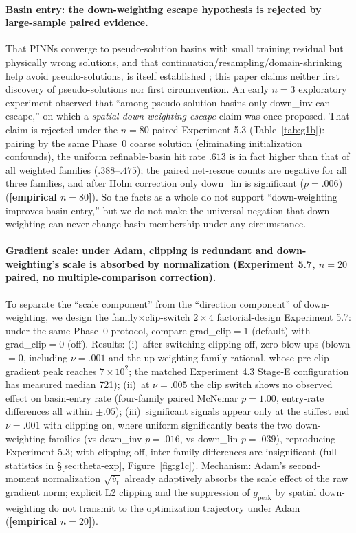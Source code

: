 \documentclass[11pt]{article}
\numberwithin{equation}{section}
\begin{document}
\paragraph{Basin entry: the down-weighting escape hypothesis is rejected by large-sample paired evidence.}
That PINNs converge to pseudo-solution basins with small training residual but physically wrong solutions, and that continuation/resampling/domain-shrinking help avoid pseudo-solutions, is itself established \cite{Rohrhofer2022,WangPseudo2026}; this paper claims neither first discovery of pseudo-solutions nor first circumvention. An early $n=3$ exploratory experiment observed that ``among pseudo-solution basins only down\_inv can escape,'' on which a \emph{spatial down-weighting escape} claim was once proposed. That claim is rejected under the $n=80$ paired Experiment 5.3 (Table~\ref{tab:g1b}): pairing by the same Phase~0 coarse solution (eliminating initialization confounds), the uniform refinable-basin hit rate $.613$ is in fact higher than that of all weighted families ($.388$--$.475$); the paired net-rescue counts are negative for all three families, and after Holm correction only down\_lin is significant ($p=.006$) (\textbf{[empirical $n=80$]}). So the facts as a whole do not support ``down-weighting improves basin entry,'' but we do not make the universal negation that down-weighting can never change basin membership under any circumstance.

\paragraph{Gradient scale: under Adam, clipping is redundant and down-weighting's scale is absorbed by normalization (Experiment 5.7, $n=20$ paired, no multiple-comparison correction).}
To separate the ``scale component'' from the ``direction component'' of down-weighting, we design the family$\times$clip-switch $2\times4$ factorial-design Experiment 5.7: under the same Phase~0 protocol, compare grad\_clip$=1$ (default) with grad\_clip$=0$ (off). Results: (i)~after switching clipping off, zero blow-ups (blown$=0$, including $\nu=.001$ and the up-weighting family rational, whose pre-clip gradient peak reaches $7\times10^2$; the matched Experiment 4.3 Stage-E configuration has measured median 721); (ii)~at $\nu=.005$ the clip switch shows no observed effect on basin-entry rate (four-family paired McNemar $p=1.00$, entry-rate differences all within $\pm.05$); (iii)~significant signals appear only at the stiffest end $\nu=.001$ with clipping on, where uniform significantly beats the two down-weighting families (vs down\_inv $p=.016$, vs down\_lin $p=.039$), reproducing Experiment 5.3; with clipping off, inter-family differences are insignificant (full statistics in \S\ref{sec:theta-exp}, Figure~\ref{fig:g1c}). Mechanism: Adam's second-moment normalization $\sqrt{\hat v_t}$ already adaptively absorbs the scale effect of the raw gradient norm; explicit L2 clipping and the suppression of $g_{\text{peak}}$ by spatial down-weighting do not transmit to the optimization trajectory under Adam (\textbf{[empirical $n=20$]}).
\end{document}
